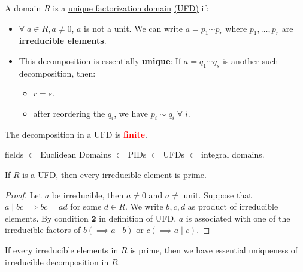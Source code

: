 \begin{definition}
	A domain \( R \) is a \underline{unique factorization domain} \underline{(UFD)} if:
	\begin{itemize}
		\item \( \forall \; a\in R, a\ne 0 \), \( a \) is not a unit. We can write \( a = p_1 \cdots p_r \) where \( p_1,\ldots, p_r \) are \textbf{irreducible elements}.
		\item This decomposition is essentially \textbf{unique}: If \( a = q_1\cdots q_s \) is another such decomposition, then:
		      \begin{itemize}
			      \item \( r=s \).
			      \item after reordering the \( q_i \), we have \( p_i \sim q_i \; \forall \; i \).
		      \end{itemize}
	\end{itemize}
	\begin{note}
		The decomposition in a UFD is \textbf{\textcolor{red}{finite}}.
	\end{note}
\end{definition}

\begin{conclusion}
	fields \( \subset \) Euclidean Domains \( \subset \) PIDs \( \subset \) UFDs \( \subset \) integral domains.
\end{conclusion}

\begin{proposition}
	\label{prop:cond2-ufd}
	If \( R \) is a UFD, then every irreducible element is prime.
\end{proposition}

\begin{proof}
	Let \( a \) be irreducible, then \( a\ne 0 \) and \( a\ne \) unit. Suppose that \( a\mid bc
	\implies bc = ad\) for some \( d\in R \). We write \( b,c,d \) as product of irreducible elements.
	By condition \( \mathbf 2 \) in definition of UFD, \( a \) is associated with one of the
	irreducible factors of \( b (\implies a\mid b) \) or \( c (\implies a\mid c)\).
\end{proof}

\begin{proposition}
	\label{prop:decomp-irred}
	If every irreducible elements in \( R \) is prime, then we have essential uniqueness of
	irreducible decomposition in \( R \).
\end{proposition}

